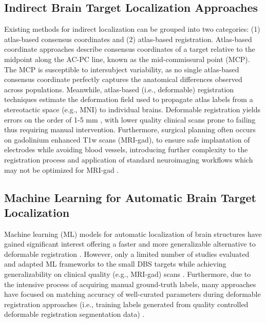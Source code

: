 \subsection{Indirect Brain Target Localization Approaches}
Existing methods for indirect localization can be grouped into two categories: (1) atlas-based consensus coordinates and (2) atlas-based registration. Atlas-based coordinate approaches describe consensus coordinates of a target relative to the midpoint along the AC-PC line, known as the mid-commissural point (MCP). The MCP is susceptible to intersubject variability, as no single atlas-based consensus coordinate perfectly captures the anatomical differences observed across populations. Meanwhile, atlas-based (i.e., deformable) registration techniques estimate the deformation field used to propagate atlas labels from a stereotactic space (e.g., MNI) to individual brains. Deformable registration yields errors on the order of 1-5 mm \cite{Lau2019-eh, Abbass2022-lf, Miller2023-ct}, with lower quality clinical scans prone to failing thus requiring manual intervention. Furthermore, surgical planning often occurs on gadolinium enhanced T1w scans (MRI-gad), to ensure safe implantation of electrodes while avoiding blood vessels, introducing further complexity to the  registration process \cite{Abbass2022-lf, Abbass2025-el} and application of standard neuroimaging workflows which may not be optimized for MRI-gad \cite{Ogunsanya2024-uf, Warntjes2014-wy}.

\subsection{Machine Learning for Automatic Brain Target Localization}
Machine learning (ML) models for automatic localization of brain structures have gained significant interest offering a faster and more generalizable alternative to deformable registration \cite{Baniasadi2023-lm, Ren2025-zu}. However, only a limited number of studies evaluated and adapted ML frameworks to the small DBS targets while achieving generalizability on clinical quality (e.g., MRI-gad) scans \cite{Baniasadi2023-lm}. Furthermore, due to the intensive process of acquiring manual ground-truth labels, many approaches have focused on matching accuracy of well-curated parameters during deformable registration approaches (i.e., training labels generated from quality controlled deformable registration segmentation data) \cite{Baniasadi2023-lm}.


